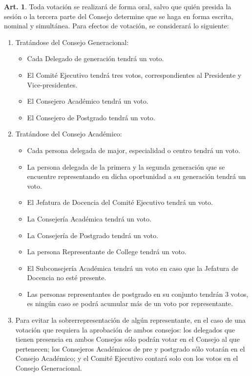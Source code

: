 \documentclass[letterpaper,11pt]{article}
\theoremstyle{definition}%
\newtheorem{art}{Art.} %
\begin{document}
\begin{art}\label{votacioncesConsejo}
	Toda votación se realizará de forma oral, salvo que quién presida la sesión o la tercera parte del Consejo determine que se haga en forma escrita, nominal y simultánea. Para efectos de votación, se considerará lo siguiente:
	\begin{enumerate}
		\item Tratándose del Consejo Generacional:
		      \begin{itemize}
			      \item Cada Delegado de generación tendrá un voto.
			      \item El Comité Ejecutivo tendrá tres votos, correspondientes al Presidente y Vice-presidentes.
			      \item El Consejero Académico tendrá un voto.
			      \item El Consejero de Postgrado tendrá un voto.
		      \end{itemize}
		\item Tratándose del Consejo Académico:
		      \begin{itemize}
			      \item Cada persona delegada de major, especialidad o centro tendrá un voto.
			      \item La persona delegada de la primera y la segunda generación que se encuentre representando en dicha oportunidad a su generación tendrá un voto.
			      \item El Jefatura de Docencia del Comité Ejecutivo tendrá un voto.
			      \item La Consejería Académica tendrá un voto.
			      \item La Consejería de Postgrado tendrá un voto.
			      \item La persona Representante de College tendrá un voto.
			      \item El Subconsejería Académica tendrá un voto en caso que la Jefatura de Docencia no esté presente.
			      \item Las personas representantes de postgrado en su conjunto tendrán 3 votos, es ningún caso se podrá acumular más de un voto por representante.
		      \end{itemize}
		\item Para evitar la sobrerrepresentación de algún representante, en el caso de una votación que requiera la aprobación de ambos consejos: los delegados que tienen presencia en ambos Consejos sólo podrán votar en el Consejo al que pertenecen; los Consejeros Académicos de pre y postgrado sólo votarán en el Consejo Académico; y el Comité Ejecutivo contará solo con los votos en el Consejo Generacional.
	\end{enumerate}
\end{art}
\end{document}
